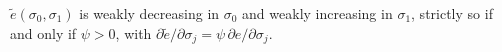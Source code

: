 \label{lem:etilde_monotone}
$\tilde e(\sigma_0,\sigma_1)$ is weakly decreasing in $\sigma_0$ and weakly increasing in $\sigma_1$, strictly so if and only if $\psi>0$, with $\partial\tilde e/\partial\sigma_j=\psi\,\partial e/\partial\sigma_j$.
